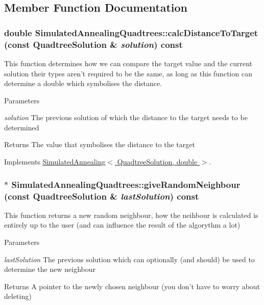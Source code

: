 \subsection{Member Function Documentation}
\hypertarget{class_simulated_annealing_quadtrees_ab067118f2ceecfe6b447b5fb7585a763}{
\subsubsection[{calcDistanceToTarget}]{\setlength{\rightskip}{0pt plus 5cm}double SimulatedAnnealingQuadtrees::calcDistanceToTarget (const {\bf QuadtreeSolution} \& {\em solution}) const}}
\label{class_simulated_annealing_quadtrees_ab067118f2ceecfe6b447b5fb7585a763}
This function determines how we can compare the target value and the current solution their types aren't required to be the same, as long as this function can determine a double which symbolises the distance. 
\begin{DoxyParams}{Parameters}
\item[{\em solution}]The previous solution of which the distance to the target needs to be determined \end{DoxyParams}
\begin{DoxyReturn}{Returns}
The value that symbolises the distance to the target 
\end{DoxyReturn}


Implements \hyperlink{class_simulated_annealing_ac68b8a3c38d3095893498b9a7e292346}{SimulatedAnnealing$<$ QuadtreeSolution, double $>$}.\hypertarget{class_simulated_annealing_quadtrees_abb953a7ff8aa3bed1d6fc99d3a3616ed}{
\subsubsection[{giveRandomNeighbour}]{ $\ast$ SimulatedAnnealingQuadtrees::giveRandomNeighbour (const {\bf QuadtreeSolution} \& {\em lastSolution}) const}}
\label{class_simulated_annealing_quadtrees_abb953a7ff8aa3bed1d6fc99d3a3616ed}
This function returns a new random neighbour, how the neihbour is calculated is entirely up to the user (and can influence the result of the algorythm a lot) 
\begin{DoxyParams}{Parameters}
\item[{\em lastSolution}]The previous solution which can optionally (and should) be used to determine the new neighbour \end{DoxyParams}
\begin{DoxyReturn}{Returns}
A pointer to the newly chosen neighbour (you don't have to worry about deleting) 
\end{DoxyReturn}


